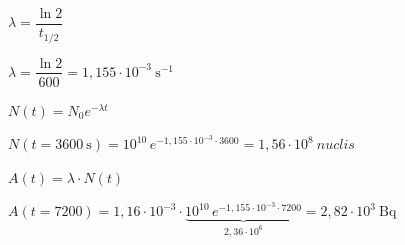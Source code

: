 \begin{solapartat}
 $\lambda = \dfrac{\ln 2}{t_{1/2}}$

 $\lambda = \dfrac{\ln 2}{600} = 1,155\cdot 10^{-3}\ \mathrm{s^{-1}}$

 $N(t) = N_0 e^{-\lambda t}$

 $N(t = 3600\ \mathrm{s}) = 10^{10}\,e^{-1,155\cdot 10^{-3}\cdot 3600} = 1,56\cdot 10^{8}\ \mathit{nuclis}$
\end{solapartat}

\begin{solapartat}
 $A(t) = \lambda\cdot N(t)$

 $A(t = 7200) = 1,16\cdot 10^{-3}\cdot\underbrace{10^{10}\,e^{-1,155\cdot 10^{-3}\cdot 7200}}_{2,36\cdot 10^{6}} = 2,82\cdot 10^{3}\ \mathrm{Bq}$
\end{solapartat}
